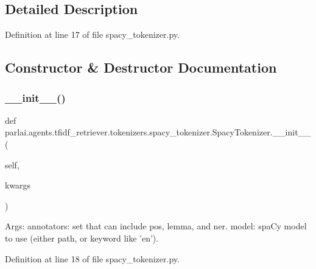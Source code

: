 \subsection{Detailed Description}


Definition at line 17 of file spacy\+\_\+tokenizer.\+py.



\subsection{Constructor \& Destructor Documentation}
\mbox{\label{classparlai_1_1agents_1_1tfidf__retriever_1_1tokenizers_1_1spacy__tokenizer_1_1SpacyTokenizer_a091dbfa93db9f2dfdaae3779c24aecb0}} 
\subsubsection{\texorpdfstring{\+\_\+\+\_\+init\+\_\+\+\_\+()}{\_\_init\_\_()}}
{\footnotesize\ttfamily def parlai.\+agents.\+tfidf\+\_\+retriever.\+tokenizers.\+spacy\+\_\+tokenizer.\+Spacy\+Tokenizer.\+\_\+\+\_\+init\+\_\+\+\_\+ (\begin{DoxyParamCaption}\item[{}]{self,  }\item[{}]{kwargs }\end{DoxyParamCaption})}

\begin{DoxyVerb}Args:
    annotators: set that can include pos, lemma, and ner.
    model: spaCy model to use (either path, or keyword like 'en').
\end{DoxyVerb}
 

Definition at line 18 of file spacy\+\_\+tokenizer.\+py.



